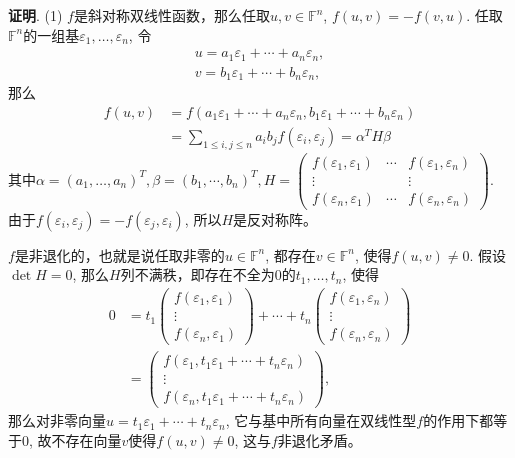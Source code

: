 \newpageorvspace

{\bf 证明}. (1) $f$是斜对称双线性函数，那么任取$u, v \in \mathbb{F}^n$, $f(u, v) = - f(v, u)$. 任取$\mathbb{F}^n$的一组基$\varepsilon_1, \ldots, \varepsilon_n$, 令
\begin{align*}
u = a_1 \varepsilon_1 + \cdots + a_n \varepsilon_n, \\
v = b_1 \varepsilon_1 + \cdots + b_n \varepsilon_n,
\end{align*}
那么
\begin{align*}
f(u, v) & = f(a_1 \varepsilon_1 + \cdots + a_n \varepsilon_n, b_1 \varepsilon_1 + \cdots + b_n \varepsilon_n) \\
& = \sum\limits_{1 \leqslant i,j \leqslant n} a_i b_j f(\varepsilon_i, \varepsilon_j) = \alpha^T H \beta
\end{align*}
其中$\alpha = (a_1, \ldots, a_n)^T, \beta = (b_1, \cdots, b_n)^T, H = \begin{pmatrix} f(\varepsilon_1, \varepsilon_1) & \cdots & f(\varepsilon_1, \varepsilon_n) \\ \vdots & & \vdots \\ f(\varepsilon_n, \varepsilon_1) & \cdots & f(\varepsilon_n, \varepsilon_n) \end{pmatrix}.$ 由于$f(\varepsilon_i, \varepsilon_j) = - f(\varepsilon_j, \varepsilon_i)$, 所以$H$是反对称阵。

$f$是非退化的，也就是说任取非零的$u \in \mathbb{F}^n$, 都存在$v \in \mathbb{F}^n$, 使得$f(u, v) \neq 0$. 假设$\det H = 0$, 那么$H$列不满秩，即存在不全为$0$的$t_1, \ldots, t_n$, 使得
\begin{align*}
0 & = t_1 \begin{pmatrix} f(\varepsilon_1, \varepsilon_1) \\ \vdots \\ f(\varepsilon_n, \varepsilon_1) \end{pmatrix} + \cdots + t_n \begin{pmatrix} f(\varepsilon_1, \varepsilon_n) \\ \vdots \\ f(\varepsilon_n, \varepsilon_n) \end{pmatrix} \\
& = \begin{pmatrix} f(\varepsilon_1, t_1 \varepsilon_1 + \cdots + t_n \varepsilon_n) \\ \vdots \\ f(\varepsilon_n, t_1 \varepsilon_1 + \cdots + t_n \varepsilon_n) \end{pmatrix},
\end{align*}
那么对非零向量$u = t_1 \varepsilon_1 + \cdots + t_n \varepsilon_n$, 它与基中所有向量在双线性型$f$的作用下都等于$0$, 故不存在向量$v$使得$f(u, v) \neq 0$, 这与$f$非退化矛盾。

